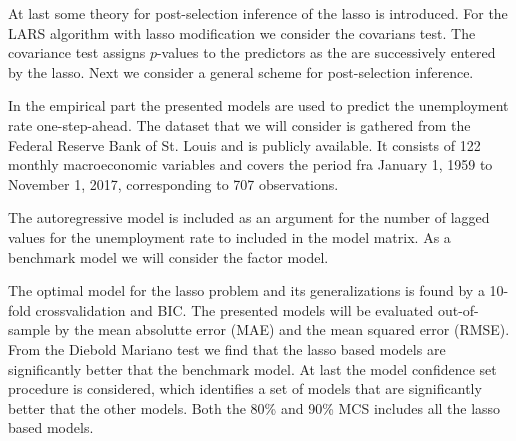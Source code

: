 At last some theory for post-selection inference of the lasso is introduced.
For the LARS algorithm with lasso modification we consider the covarians test.
The covariance test assigns \(p\)-values to the predictors as the are successively entered by the lasso.
Next we consider a general scheme for post-selection inference.

In the empirical part the presented models are used to predict the unemployment rate one-step-ahead.
The dataset that we will consider is gathered from the Federal Reserve Bank of St. Louis and is publicly available.
It consists of 122 monthly macroeconomic variables and covers the period fra January 1, 1959 to November 1, 2017, corresponding to 707 observations.

The autoregressive model is included as an argument for the number of lagged values for the unemployment rate to included in the model matrix.
As a benchmark model we will consider the factor model.

The optimal model for the lasso problem and its generalizations is found by a 10-fold crossvalidation and BIC.
The presented models will be evaluated out-of-sample by the mean absolutte error (MAE) and the mean squared error (RMSE).
From the Diebold Mariano test we find that the lasso based models are significantly better that the benchmark model. 
At last the model confidence set procedure is considered, which identifies a set of models that are significantly better that the other models.
Both the 80\% and 90\% MCS includes all the lasso based models.